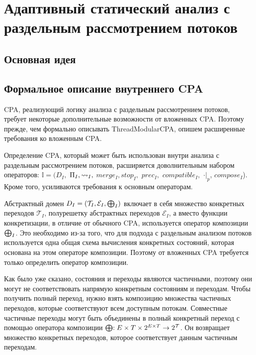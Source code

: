 \newcommand{\IR}{IR}
\newcommand{\conctm}[1]{\conc{#1}_{TM}}

\section{Адаптивный статический анализ с раздельным рассмотрением потоков}
\label{sect_tm_with_io}

\subsection{Основная идея}

\subsection{Формальное описание внутреннего CPA}
 
CPA, реализующий логику анализа с раздельным рассмотрением потоков, требует некоторые дополнительные возможности от вложенных CPA. 
Поэтому прежде, чем формально описывать ThreadModularCPA, опишем расширенные требования ко вложенным CPA.
 
Определение CPA, который может быть использован внутри анализа с раздельным рассмотрением потоков, расширяется доволнительным набором операторов: $\mathbb{I}=(D_{I},$ $\Pi_{I}, \leadsto_{I},$ $merge_{I}, stop_{I},$ $prec_{I},$ $compatible_{I},$ $\cdot|_p$, $compose_I$).
Кроме того, усиливаются требования к основным операторам.

Абстрактный домен $D_I = (\mathcal{T}_I, \mathcal{E}_I, \mathrel{\bigoplus}_I)$ включает в себя множество конкретных переходов $\mathcal{T}_I$, полурешетку абстрактных переходов $\mathcal{E}_I$, а вместо функции конкретизации, в отличие от обычного CPA, используется оператор композиции $\mathrel{\bigoplus}_I$.
Это необходимо из-за того, что для подхода с раздельным анализом потоков используется одна общая схема вычисления конкретных состояний, которая основана на этом операторе композиции. 
Поэтому от вложенных CPA требуется только определить оператор композиции.

Как было уже сказано, состояния и переходы являются частичными, поэтому они могут не соответствовать напрямую конкретным состояниям и переходам. Чтобы получить полный переход, нужно взять композицию множества частичных переходов, которые соответствуют всем доступным потокам. Совместные частичные переходы могут быть объединены в полный конкретный переход с помощью оператора композиции $\mathrel{\bigoplus}: E \times T \times 2^{E \times T} \to 2^{\mathcal{T}}$.
Он возвращает множество конкретных переходов, которое соответствует данным частичным переходам.

